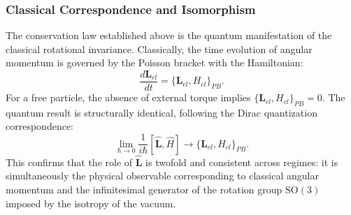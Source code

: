 \subsubsection{Classical Correspondence and Isomorphism}

The conservation law established above is the quantum manifestation of the
classical rotational invariance. Classically, the time evolution of angular
momentum is governed by the Poisson bracket with the Hamiltonian:
\begin{equation}
  \frac{d\mathbf{L}_{cl}}{dt} = \{ \mathbf{L}_{cl}, H_{cl} \}_{PB}.
\end{equation}
For a free particle, the absence of external torque implies $\{ \mathbf{L}_{cl},
H_{cl} \}_{PB} = 0$. The quantum result is structurally identical, following the
Dirac quantization correspondence:
\begin{equation}
  \lim_{\hbar \to 0} \frac{1}{i\hbar} [\hat{\mathbf{L}}, \hat{H}]
  \longrightarrow \{ \mathbf{L}_{cl}, H_{cl} \}_{PB}.
\end{equation}
This confirms that the role of $\hat{\mathbf{L}}$ is twofold and consistent
across regimes: it is simultaneously the physical observable corresponding to
classical angular momentum and the infinitesimal generator of the rotation group
$\mathrm{SO}(3)$ imposed by the isotropy of the vacuum.
